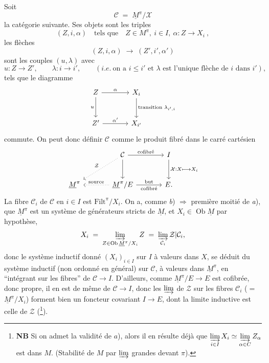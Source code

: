 \documentclass[11pt]{article}
\newcommand{\printedpage}[1]{\marginpar{\footnotesize p.~#1}}
\newcommand{\msp}[1]{\marginpar{\footnotesize [#1]}}
\begin{document}
\printedpage{49}

\msp{page 91}Soit
\[ \mathcal{C} \;=\; \underline{M}^\pi/\mathcal{X} \]
la catégorie suivante. Ses objets sont les triples
\[ (Z,i,\alpha) \quad \text{tels que} \quad Z\in M^\pi,\ i\in I,\ \alpha : Z\longrightarrow X_i \ , \]
les flèches
\[ (Z,i,\alpha) \;\longrightarrow\; (Z',i',\alpha') \]
sont les couples $(u,\lambda)$ avec
\[ u : Z\longrightarrow Z', \qquad \lambda : i\longrightarrow i', \qquad (\textit{i.e.}\ \text{on a } i\le i' \text{ et } \lambda \text{ est l'unique flèche de } i \text{ dans } i'), \]
tels que le diagramme
\[
\begin{tikzcd}[row sep=large, column sep=large]
Z \arrow[r,"\alpha"] \arrow[d,"u"'] & X_i \arrow[d,"\text{transition } \lambda_{i',i}"] \\
Z' \arrow[r,"\alpha'"] & X_{i'}
\end{tikzcd}
\]
commute. On peut donc définir $\mathcal{C}$ comme le produit fibré dans le carré cartésien
\[
\begin{tikzcd}[row sep=large, column sep=large]
 & \mathcal{C} \arrow[r,"\text{cofibré}"] \arrow[d] \arrow[dl,dotted,"\mathcal{Z}"'] & I \arrow[d,"\mathcal{X} : X \longmapsto X_i"] \\ %
\underline{M}^\pi & \underline{M}^\pi/E \arrow[l,dotted,"\text{source}"'] \arrow[r,"\text{but}","\text{cofibré}"'] & E.
\end{tikzcd}
\]
La fibre $\mathcal{C}_i$ de $\mathcal{C}$ en $i\in I$ est $\mathrm{Filt}^\pi/X_i$. On a, comme \textit{b}) $\Longrightarrow$ première moitié de \textit{a}), que $\underline{M}^\pi$ est un
\msp{page 92}système de générateurs stricts de $\underline{M}$, et $X_i\in\operatorname{Ob}\underline{M}$ par hypothèse,
\[ X_i \;=\; \varinjlim_{Z\in\operatorname{Ob}\underline{M}^\pi/X_i} Z \;=\; \varinjlim_{\mathcal{C}_i}\mathcal{Z}|\mathcal{C}_i, \]
donc le système inductif donné $(X_i)_{i\in I}$ sur $I$ à valeurs dans $X$, se déduit du système inductif (non ordonné en général) sur $\mathcal{C}$, à valeurs dans $\underline{M}^\pi$, en ``intégrant sur les fibres'' de $\mathcal{C}\longrightarrow I$. D'ailleurs, comme $\underline{M}^\pi/E\longrightarrow E$ est cofibrée, donc propre, il en est de même de $\mathcal{C}\longrightarrow I$, donc les $\varinjlim$ de $\mathcal{Z}$ sur les fibres $\mathcal{C}_i$ ($=$ $\underline{M}^\pi/X_i$) forment bien un foncteur covariant $I\longrightarrow E$, dont la limite inductive est celle de $\mathcal{Z}$ (\footnote[43]{\textbf{NB} Si on admet la validité de $a$), alors il en résulte déjà que $\varinjlim\limits_{i\in I} X_i \simeq \varinjlim\limits_{\alpha\in C} Z_\alpha$ est dans $M$. (Stabilité de $M$ par $\varinjlim$ grandes devant $\pi$).}).
\end{document}

